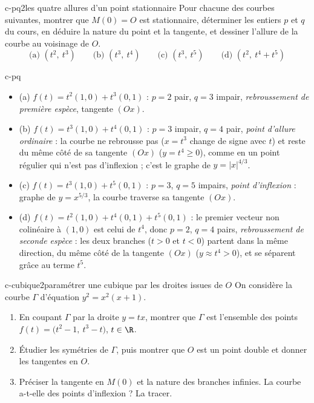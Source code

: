\begin{exo}{c-pq}{2}{les quatre allures d'un point stationnaire}
Pour chacune des courbes suivantes, montrer que $M(0)=O$ est stationnaire, déterminer les entiers $p$ et $q$ du cours, en déduire la nature du point et la tangente, et dessiner l'allure de la courbe au voisinage de $O$.
\[\text{(a) }(t^2,\ t^3)\qquad\text{(b) }(t^3,\ t^4)\qquad\text{(c) }(t^3,\ t^5)\qquad\text{(d) }(t^2,\ t^4+t^5)\]
\end{exo}

\begin{corrige}{c-pq}
\begin{itemize}
\item (a) $f(t)=t^2(1,0)+t^3(0,1)$ : $p=2$ pair, $q=3$ impair, \emph{rebroussement de première espèce}, tangente $(Ox)$.
\item (b) $f(t)=t^3(1,0)+t^4(0,1)$ : $p=3$ impair, $q=4$ pair, \emph{point d'allure ordinaire} : la courbe ne rebrousse pas ($x=t^3$ change de signe avec $t$) et reste du même côté de sa tangente $(Ox)$ ($y=t^4\geq0$), comme en un point régulier qui n'est pas d'inflexion ; c'est le graphe de $y=|x|^{4/3}$.
\item (c) $f(t)=t^3(1,0)+t^5(0,1)$ : $p=3$, $q=5$ impairs, \emph{point d'inflexion} : graphe de $y=x^{5/3}$, la courbe traverse sa tangente $(Ox)$.
\item (d) $f(t)=t^2(1,0)+t^4(0,1)+t^5(0,1)$ : le premier vecteur non colinéaire à $(1,0)$ est celui de $t^4$, donc $p=2$, $q=4$ pairs, \emph{rebroussement de seconde espèce} : les deux branches ($t>0$ et $t<0$) partent dans la même direction, du même côté de la tangente $(Ox)$ ($y\approx t^4>0$), et se séparent grâce au terme $t^5$.
\end{itemize}
\end{corrige}

\begin{exo}{c-cubique}{2}{paramétrer une cubique par les droites issues de $O$}
On considère la courbe $\Gamma$ d'équation $y^2=x^2(x+1)$.
\begin{enumerate}
\item En coupant $\Gamma$ par la droite $y=tx$, montrer que $\Gamma$ est l'ensemble des points $f(t)=\big(t^2-1,\ t^3-t\big)$, $t\in\R$.
\item Étudier les symétries de $\Gamma$, puis montrer que $O$ est un point double et donner les tangentes en $O$.
\item Préciser la tangente en $M(0)$ et la nature des branches infinies. La courbe a-t-elle des points d'inflexion ? La tracer.
\end{enumerate}
\end{exo}

